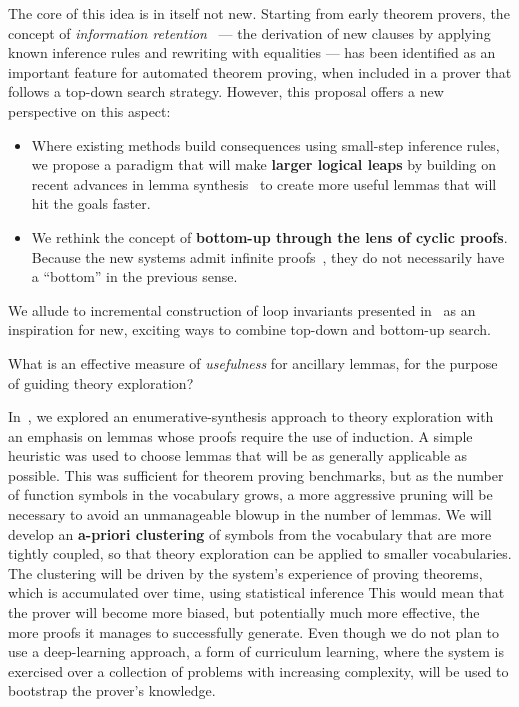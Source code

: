 The core of this idea is in itself not new.
Starting from early theorem provers, the concept of \emph{information retention}~\cite{JAR1995:Voronkov} --- the derivation of new clauses by applying known inference rules and rewriting with equalities --- has been identified as an important feature for automated theorem proving, \esp when included in a prover that follows a top-down search strategy.
However, this proposal offers a new perspective on this aspect:
\begin{itemize}
  \item Where existing methods build consequences using small-step inference rules, we propose a paradigm that will make \textbf{larger logical leaps} by building on recent advances in lemma synthesis~\cite{moa,thesy,CAV2021:Murali} to create more useful lemmas that will hit the goals faster.
  \item We rethink the concept of \textbf{bottom-up through the lens of cyclic proofs}.
  Because the new systems admit infinite proofs~\cite{LICS2007:Brotherston,more}, they do not necessarily have a ``bottom'' in the previous sense.
\end{itemize}

We allude to incremental construction of loop invariants presented in~\cite{arXiv2020:Padon,FAC2008:Bradley} as an inspiration for new, exciting ways to combine top-down and bottom-up search.


\begin{researchquestion}
What is an effective measure of \emph{usefulness} for ancillary lemmas, for the purpose of guiding theory exploration?
\end{researchquestion}

In~\cite{thesy}, we explored an enumerative-synthesis approach to theory exploration with an emphasis on lemmas whose proofs require the use of induction.
A simple heuristic was used to choose lemmas that will be as generally applicable as possible.
This was sufficient for theorem proving benchmarks, but as the number of function symbols in the vocabulary grows, a more aggressive pruning will be necessary to avoid an unmanageable blowup in the number of lemmas.
We will develop an \textbf{a-priori clustering} of symbols from the vocabulary that are more tightly coupled, so that theory exploration can be applied to smaller vocabularies.
The clustering will be driven by the system's experience of proving theorems, which is accumulated over time, using statistical inference
This would mean that the prover will become more biased, but potentially much more effective, the more proofs it manages to successfully generate.
Even though we do not plan to use a deep-learning approach, a form of curriculum learning, where the system is exercised over a collection of problems with increasing complexity, will be used to bootstrap the prover's knowledge.

